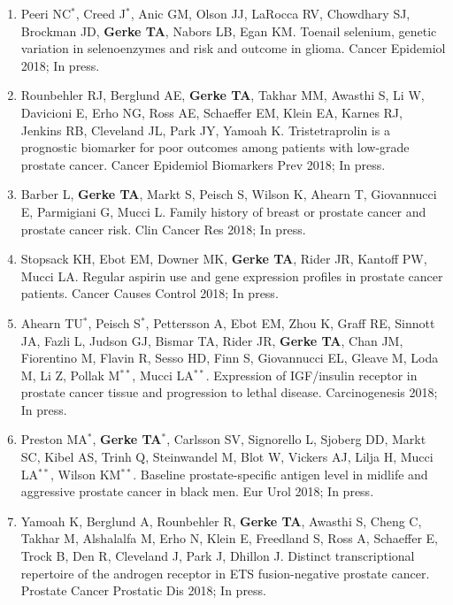 \documentclass[11pt, a4paper]{article} %
\begin{document}
\begin{enumerate}[leftmargin=*]
\item{} Peeri NC$^*$, Creed J$^*$, Anic GM, Olson JJ, LaRocca RV, Chowdhary SJ, Brockman JD, {\bf Gerke TA}, Nabors LB, Egan KM. Toenail selenium, genetic variation in selenoenzymes and risk and outcome in glioma. Cancer Epidemiol 2018; In press.

\item{} Rounbehler RJ, Berglund AE, {\bf Gerke TA}, Takhar MM, Awasthi S, Li W, Davicioni E, Erho NG, Ross AE, Schaeffer EM, Klein EA, Karnes RJ, Jenkins RB, Cleveland JL, Park JY, Yamoah K. Tristetraprolin is a prognostic biomarker for poor outcomes among patients with low-grade prostate cancer. Cancer Epidemiol Biomarkers Prev 2018; In press.

\item{} Barber L, {\bf Gerke TA}, Markt S, Peisch S, Wilson K, Ahearn T, Giovannucci E, Parmigiani G, Mucci L. Family history of breast or prostate cancer and prostate cancer risk. Clin Cancer Res 2018; In press.

\item{} Stopsack KH, Ebot EM, Downer MK, {\bf Gerke TA}, Rider JR, Kantoff PW, Mucci LA. Regular aspirin use and gene expression profiles in prostate cancer patients. 	Cancer Causes Control 2018; In press.

\item{} Ahearn TU$^*$, Peisch S$^*$, Pettersson A, Ebot EM, Zhou K, Graff RE, Sinnott JA, Fazli L, Judson GJ, Bismar TA, Rider JR, {\bf Gerke TA}, Chan JM, Fiorentino M, Flavin R, Sesso HD, Finn S, Giovannucci EL, Gleave M, Loda M, Li Z, Pollak M$^{**}$, Mucci LA$^{**}$. Expression of IGF/insulin receptor in prostate cancer tissue and progression to lethal disease. Carcinogenesis 2018; In press. 

\item{} Preston MA$^*$, {\bf Gerke TA$^*$}, Carlsson SV, Signorello L, Sjoberg DD, Markt SC, Kibel AS, Trinh Q, Steinwandel M, Blot W, Vickers AJ, Lilja H, Mucci LA$^{**}$, Wilson KM$^{**}$. Baseline prostate-specific antigen level in midlife and aggressive prostate cancer in black men. Eur Urol 2018; In press.

\item{} Yamoah K, Berglund A, Rounbehler R, {\bf Gerke TA}, Awasthi S, Cheng C, Takhar M, Alshalalfa M, Erho N, Klein E, Freedland S, Ross A, Schaeffer E, Trock B, Den R, Cleveland J, Park J, Dhillon J. Distinct transcriptional repertoire of the androgen receptor in ETS fusion-negative prostate cancer. Prostate Cancer Prostatic Dis 2018; In press.


\end{enumerate}
\end{document}
